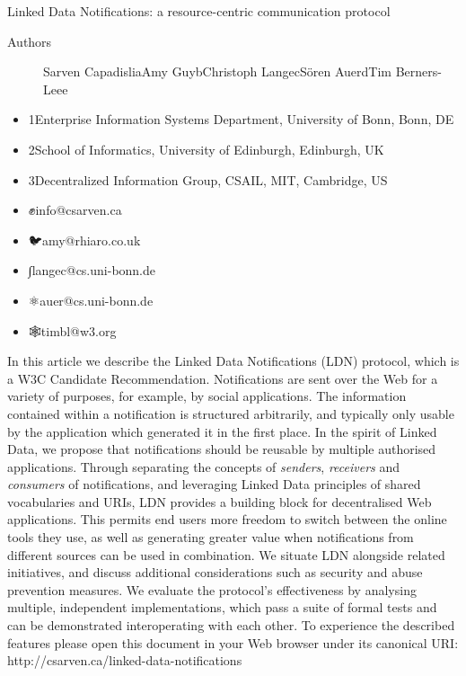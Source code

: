 \documentclass[a4paper]{llncs}
\begin{document}
                Linked Data Notifications: a resource-centric communication protocol


                    \begin{description}
  \item[Authors] \empty Sarven Capadisli\empty a\empty Amy Guy\empty b\empty Christoph Lange\empty c\empty Sören Auer\empty d\empty Tim Berners-Lee\empty e
    \end{description}


                    \begin{itemize}
  \item 1Enterprise Information Systems Department, \empty University of Bonn, Bonn, DE\item 2School of Informatics, \empty University of Edinburgh, Edinburgh, UK\item 3Decentralized Information Group, CSAIL, \empty MIT, Cambridge, US
    \end{itemize}


                    \begin{itemize}
  \item ✊\empty info@csarven.ca\item 🐦\empty amy@rhiaro.co.uk\item ∫\empty langec@cs.uni-bonn.de\item ⚛\empty auer@cs.uni-bonn.de\item 🕸\empty timbl@w3.org
    \end{itemize}








\par In this article we describe the Linked Data Notifications (LDN) protocol, which is a \empty W3C Candidate Recommendation. Notifications are sent over the Web for a variety of purposes, for example, by social applications. The information contained within a notification is structured arbitrarily, and typically only usable by the application which generated it in the first place. In the spirit of Linked Data, we propose that notifications should be reusable by multiple authorised applications. Through separating the concepts of {\em senders}, {\em receivers} and {\em consumers} of notifications, and leveraging Linked Data principles of shared vocabularies and URIs, LDN provides a building block for decentralised Web applications. This permits end users more freedom to switch between the online tools they use, as well as generating greater value when notifications from different sources can be used in combination. We situate LDN alongside related initiatives, and discuss additional considerations such as security and abuse prevention measures. We evaluate the protocol’s effectiveness by analysing multiple, independent implementations, which pass a suite of formal tests and can be demonstrated interoperating with each other. To experience the described features please open this document in your Web browser under its canonical URI: http://csarven.ca/linked-data-notifications
\end{document}
